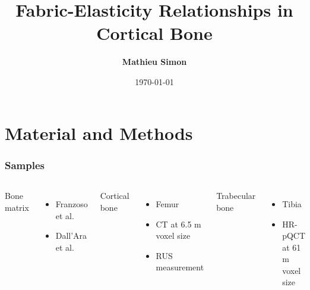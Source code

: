 \documentclass[xcolor=table,11pt]{beamer}
\title[FABCORT]{Fabric-Elasticity Relationships in Cortical Bone}
\author[mathieu.simon@unibe.ch]{\tiny{\bf{Mathieu Simon}}}
\date{\today}
\begin{document}
	
	\begin{frame}
		\titlepage
	\end{frame}
	
	
	\section{Material and Methods}

	\begin{frame}
		\frametitle{Samples}
		\begin{columns}
			\column{0.5\linewidth}

			Bone matrix
			\begin{itemize}
				\item Franzoso et al. \cite{p1}
				\item Dall'Ara et al. \cite{p2}
			\end{itemize}

			Cortical bone
			\begin{itemize}
				\item Femur
				\item \textmu CT at 6.5 \textmu m voxel size
				\item RUS measurement
			\end{itemize}

			Trabecular bone
			\begin{itemize}
				\item Tibia
				\item HR-pQCT at 61 \textmu m voxel size
			\end{itemize}

			\column{0.5\linewidth}
			\includegraphics[width=\linewidth]{../Results/Scans/2009_213_L}
		\end{columns}
	\end{frame}
\end{document}
